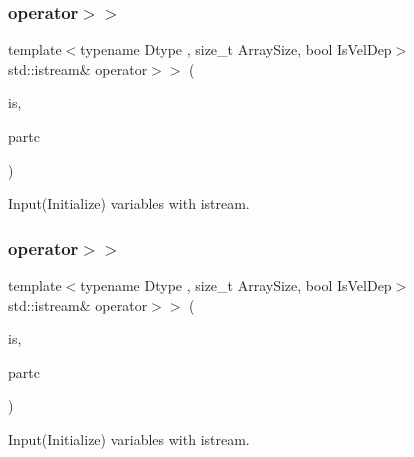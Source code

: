 \subsubsection{\texorpdfstring{operator$>$$>$}{operator>>}\hspace{0.1cm}{\footnotesize\ttfamily [1/2]}}
{\footnotesize\ttfamily template$<$typename Dtype , size\+\_\+t Array\+Size, bool Is\+Vel\+Dep$>$ \\
std\+::istream\& operator$>$$>$ (\begin{DoxyParamCaption}\item[{std\+::istream \&}]{is,  }\item[{\mbox{\hyperlink{class_space_h_1_1_vel_indep_chain_particles}{Vel\+Indep\+Chain\+Particles}}$<$ Dtype, Array\+Size, Is\+Vel\+Dep $>$ \&}]{partc }\end{DoxyParamCaption})\hspace{0.3cm}{\ttfamily [friend]}}



Input(\+Initialize) variables with istream. 

\mbox{\label{class_space_h_1_1_vel_indep_chain_particles_a87208692311239cfefd6d58ea4ce39ce}} 
\subsubsection{\texorpdfstring{operator$>$$>$}{operator>>}\hspace{0.1cm}{\footnotesize\ttfamily [2/2]}}
{\footnotesize\ttfamily template$<$typename Dtype , size\+\_\+t Array\+Size, bool Is\+Vel\+Dep$>$ \\
std\+::istream\& operator$>$$>$ (\begin{DoxyParamCaption}\item[{std\+::istream \&}]{is,  }\item[{\mbox{\hyperlink{class_space_h_1_1_vel_indep_chain_particles}{Vel\+Indep\+Chain\+Particles}}$<$ Dtype, Array\+Size, Is\+Vel\+Dep $>$ \&}]{partc }\end{DoxyParamCaption})\hspace{0.3cm}{\ttfamily [friend]}}



Input(\+Initialize) variables with istream. 



